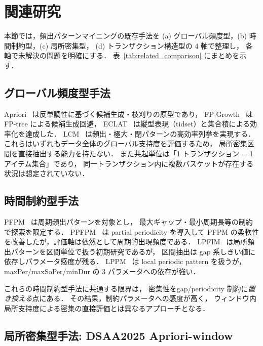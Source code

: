 \section{関連研究}
\label{sec:related_works}

本節では，頻出パターンマイニングの既存手法を
(a) グローバル頻度型，(b) 時間制約型，(c) 局所密集型，
(d) トランザクション構造型の 4 軸で整理し，
各軸で未解決の問題を明確にする．
表~\ref{tab:related_comparison} にまとめを示す．

\subsection{グローバル頻度型手法}
\label{sec:related_global}

Apriori~\cite{agrawal1994fast} は反単調性に基づく候補生成・枝刈りの原型であり，
FP-Growth~\cite{han2000mining} は FP-tree による候補生成回避，
ECLAT~\cite{zaki2000scalable} は縦型表現（tidset）と集合積による効率化を達成した．
LCM~\cite{uno2004lcm} は頻出・極大・閉パターンの高効率列挙を実現する．
これらはいずれもデータ全体のグローバル支持度を評価するため，
局所密集区間を直接抽出する能力を持たない．
また共起単位は「1 トランザクション = 1 アイテム集合」であり，
同一トランザクション内に複数バスケットが存在する状況は想定されていない．

\subsection{時間制約型手法}
\label{sec:related_temporal}

PFPM~\cite{tanbeer2009discovering} は周期頻出パターンを対象とし，
最大ギャップ・最小周期長等の制約で探索を限定する．
PPFPM~\cite{kiran2017discovering} は partial periodicity を導入して
PFPM の柔軟性を改善したが，評価軸は依然として周期的出現頻度である．
LPFIM~\cite{mahanta2005finding} は局所頻出パターンを区間単位で扱う初期研究であるが，
区間抽出は gap 系しきい値に依存しパラメータ感度が残る．
LPPM~\cite{fournier2020local} は local periodic pattern を扱うが，
maxPer/maxSoPer/minDur の 3 パラメータへの依存が強い．

これらの時間制約型手法に共通する限界は，
密集性をgap/periodicity 制約に\emph{置き換える}点にある．
その結果，制約パラメータへの感度が高く，
ウィンドウ内局所支持度による密集の直接評価とは異なるアプローチとなる．

\subsection{局所密集型手法: DSAA2025 Apriori-window}
\label{sec:related_dsaa2025}

